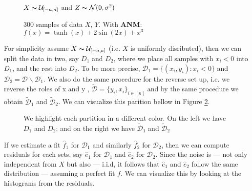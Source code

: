 \begin{figure}[H]
    \captionsetup[subfigure]{labelformat=empty}
    \centering

    \caption{300 samples of data $X$, $Y$. With \textbf{ANM}: \\
    $f(x) = \tanh(x) + 2\sin(2x) + x^3$}
    $X \thicksim \mathcal{U}_{[-a, a]}$ and $Z \thicksim \mathcal{N}(0, \sigma^2)$
    \label{fig:algo_data}
\end{figure}



For simplicity assume $X \thicksim \mathcal{U}_{[-a, a]}$ (i.e. $X$ is uniformly disributed), then we can split 
the data in two, say $D_1$ and $D_2$, where we place all samples with $x_i < 0$ into $D_1$, and the rest into 
$D_2$. To be more precise, $\mathcal{D}_1 = \{(x_i, y_i) : x_i < 0\}$ and $\mathcal{D}_2 = \mathcal{D} 
\backslash \mathcal{D}_1$. We also do the same procedure for the reverse set up, i.e. we reverse the roles of x and y
, $\mathcal{\tilde{D}} = \{y_i, x_i\}_{i \in [n]}$ and by the same procedure we obtain $\mathcal{\tilde{D}}_1$
and $\mathcal{\tilde{D}}_2$. We can visualize this parition bellow in Figure \ref{fig:colo_code}.
 
\begin{figure}[H]
    \captionsetup[subfigure]{labelformat=empty}
    \centering
    \caption{ We highlight each partition in a different color. On the left we have $D_1$ and $D_2$; and on 
    the right we have $\mathcal{\tilde{D}}_1$ and $\mathcal{\tilde{D}}_2$ }
    \label{fig:colo_code}
\end{figure}

If we estimate a fit $\hat{f}_1$ for $\mathcal{D}_1$ and similarly $\hat{f}_2$ for $\mathcal{D}_2$, then we can 
compute residuals for each sets, say $\hat{e}_1$ for $\mathcal{D}_1$  and $\hat{e}_2$ for $\mathcal{D}_2$.
Since the noise is ---  not only independent from $X$ but also ---  i.i.d, it follows that $\hat{e}_1$ and $\hat{e}_2$
follow the same distribution ---  assuming a perfect fit $f$. We can visualize this by looking at the 
histograms from the residuals.

